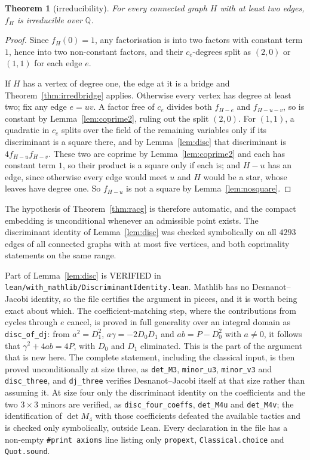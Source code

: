 \documentclass[11pt]{article}
\newtheorem{theorem}{Theorem}[section]
\theoremstyle{definition}
\theoremstyle{remark}
\theoremstyle{definition}
\begin{document}
\begin{theorem}[irreducibility]\label{thm:irred}
For every connected graph $H$ with at least two edges, $f_H$ is irreducible over $\mathbb{Q}$.
\end{theorem}

\begin{proof}
Since $f_H(0)=1$, any factorisation is into two factors with constant term $1$, hence into two
non-constant factors, and their $c_e$-degrees split as $(2,0)$ or $(1,1)$ for each edge $e$.

If $H$ has a vertex of degree one, the edge at it is a bridge and
Theorem~\ref{thm:irredbridge} applies. Otherwise every vertex has degree at least two; fix any
edge $e=uv$. A factor free of $c_e$ divides both $f_{H-e}$ and $f_{H-u-v}$, so is constant by
Lemma~\ref{lem:coprime2}, ruling out the split $(2,0)$. For $(1,1)$, a quadratic in $c_e$ splits
over the field of the remaining variables only if its discriminant is a square there, and by
Lemma~\ref{lem:disc} that discriminant is $4f_{H-u}f_{H-v}$. These two are coprime by
Lemma~\ref{lem:coprime2} and each has constant term $1$, so their product is a square only if each
is; and $H-u$ has an edge, since otherwise every edge would meet $u$ and $H$ would be a star, whose
leaves have degree one. So $f_{H-u}$ is not a square by Lemma~\ref{lem:nosquare}.
\end{proof}

The hypothesis of Theorem~\ref{thm:racg} is therefore automatic, and the compact embedding is
unconditional whenever an admissible point exists. The discriminant identity of
Lemma~\ref{lem:disc} was checked symbolically on all $4293$ edges of all connected graphs with at
most five vertices, and both coprimality statements on the same range.

Part of Lemma~\ref{lem:disc} is VERIFIED in
\texttt{lean/with\_mathlib/DiscriminantIdentity.lean}. Mathlib has no Desnanot--Jacobi identity,
so the file certifies the argument in pieces, and it is worth being exact about which. The
coefficient-matching step, where the contributions from cycles through $e$ cancel, is proved in
full generality over an integral domain as \texttt{disc\_of\_dj}: from $a^2=D_1^2$,
$a\gamma=-2D_0D_1$ and $ab=P-D_0^2$ with $a\ne0$, it follows that $\gamma^2+4ab=4P$, with $D_0$
and $D_1$ eliminated. This is the part of the argument that is new here. The complete statement,
including the classical input, is then proved unconditionally at size three, as
\texttt{det\_M3}, \texttt{minor\_u3}, \texttt{minor\_v3} and \texttt{disc\_three}, and
\texttt{dj\_three} verifies Desnanot--Jacobi itself at that size rather than assuming it. At size
four only the discriminant identity on the coefficients and the two $3\times3$ minors are
verified, as \texttt{disc\_four\_coeffs}, \texttt{det\_M4u} and \texttt{det\_M4v}; the
identification of $\det M_4$ with those coefficients defeated the available tactics and is
checked only symbolically, outside Lean. Every declaration in the file has a non-empty
\texttt{\#print axioms} line listing only \texttt{propext}, \texttt{Classical.choice} and
\texttt{Quot.sound}.
\end{document}
